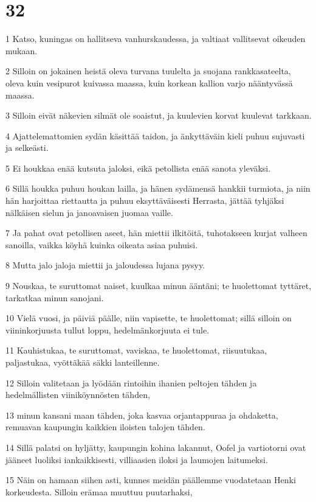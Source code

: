 \chapter{32}

\par 1 Katso, kuningas on hallitseva vanhurskaudessa, ja valtiaat vallitsevat oikeuden mukaan.
\par 2 Silloin on jokainen heistä oleva turvana tuulelta ja suojana rankkasateelta, oleva kuin vesipurot kuivassa maassa, kuin korkean kallion varjo nääntyvässä maassa.
\par 3 Silloin eivät näkevien silmät ole soaistut, ja kuulevien korvat kuulevat tarkkaan.
\par 4 Ajattelemattomien sydän käsittää taidon, ja änkyttäväin kieli puhuu sujuvasti ja selkeästi.
\par 5 Ei houkkaa enää kutsuta jaloksi, eikä petollista enää sanota yleväksi.
\par 6 Sillä houkka puhuu houkan lailla, ja hänen sydämensä hankkii turmiota, ja niin hän harjoittaa riettautta ja puhuu eksyttäväisesti Herrasta, jättää tyhjäksi nälkäisen sielun ja janoavaisen juomaa vaille.
\par 7 Ja pahat ovat petollisen aseet, hän miettii ilkitöitä, tuhotakseen kurjat valheen sanoilla, vaikka köyhä kuinka oikeata asiaa puhuisi.
\par 8 Mutta jalo jaloja miettii ja jaloudessa lujana pysyy.
\par 9 Nouskaa, te suruttomat naiset, kuulkaa minun ääntäni; te huolettomat tyttäret, tarkatkaa minun sanojani.
\par 10 Vielä vuosi, ja päiviä päälle, niin vapisette, te huolettomat; sillä silloin on viininkorjuusta tullut loppu, hedelmänkorjuuta ei tule.
\par 11 Kauhistukaa, te suruttomat, vaviskaa, te huolettomat, riisuutukaa, paljastukaa, vyöttäkää säkki lanteillenne.
\par 12 Silloin valitetaan ja lyödään rintoihin ihanien peltojen tähden ja hedelmällisten viiniköynnösten tähden,
\par 13 minun kansani maan tähden, joka kasvaa orjantappuraa ja ohdaketta, remuavan kaupungin kaikkien iloisten talojen tähden.
\par 14 Sillä palatsi on hyljätty, kaupungin kohina lakannut, Oofel ja vartiotorni ovat jääneet luoliksi iankaikkisesti, villiaasien iloksi ja laumojen laitumeksi.
\par 15 Näin on hamaan siihen asti, kunnes meidän päällemme vuodatetaan Henki korkeudesta. Silloin erämaa muuttuu puutarhaksi,
